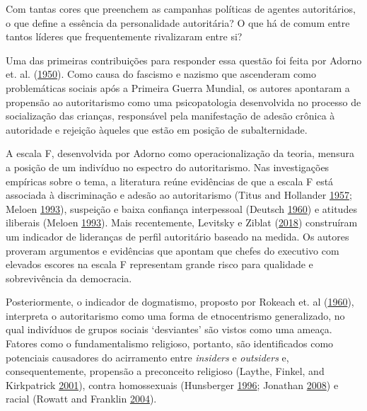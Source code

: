 \documentclass[12 pt,]{article}
\begin{document}
Com tantas cores que preenchem as campanhas políticas de agentes
autoritários, o que define a essência da personalidade autoritária? O
que há de comum entre tantos líderes que frequentemente rivalizaram
entre si?

Uma das primeiras contribuições para responder essa questão foi feita
por Adorno et. al.
(\protect\hyperlink{ref-adorno1950authoritarian}{1950}). Como causa do
fascismo e nazismo que ascenderam como problemáticas sociais após a
Primeira Guerra Mundial, os autores apontaram a propensão ao
autoritarismo como uma psicopatologia desenvolvida no processo de
socialização das crianças, responsável pela manifestação de adesão
crônica à autoridade e rejeição àqueles que estão em posição de
subalternidade.

A escala F, desenvolvida por Adorno como operacionalização da teoria,
mensura a posição de um indivíduo no espectro do autoritarismo. Nas
investigações empíricas sobre o tema, a literatura reúne evidências de
que a escala F está associada à discriminação e adesão ao autoritarismo
(Titus and Hollander \protect\hyperlink{ref-titus1957california}{1957};
Meloen \protect\hyperlink{ref-meloen1993f}{1993}), suspeição e baixa
confiança interpessoal (Deutsch
\protect\hyperlink{ref-deutsch1960trust}{1960}) e atitudes iliberais
(Meloen \protect\hyperlink{ref-meloen1993f}{1993}). Mais recentemente,
Levitsky e Ziblat
(\protect\hyperlink{ref-levitsky2018democracies}{2018}) construíram um
indicador de lideranças de perfil autoritário baseado na medida. Os
autores proveram argumentos e evidências que apontam que chefes do
executivo com elevados escores na escala F representam grande risco para
qualidade e sobrevivência da democracia.

Posteriormente, o indicador de dogmatismo, proposto por Rokeach et. al
(\protect\hyperlink{ref-rokeach1960open}{1960}), interpreta o
autoritarismo como uma forma de etnocentrismo generalizado, no qual
indivíduos de grupos sociais `desviantes' são vistos como uma ameaça.
Fatores como o fundamentalismo religioso, portanto, são identificados
como potenciais causadores do acirramento entre \emph{insiders} e
\emph{outsiders} e, consequentemente, propensão a preconceito religioso
(Laythe, Finkel, and Kirkpatrick
\protect\hyperlink{ref-laythe2001predicting}{2001}), contra homossexuais
(Hunsberger \protect\hyperlink{ref-hunsberger1996religious}{1996};
Jonathan \protect\hyperlink{ref-jonathan2008influence}{2008}) e racial
(Rowatt and Franklin \protect\hyperlink{ref-rowatt2004christian}{2004}).
\end{document}
